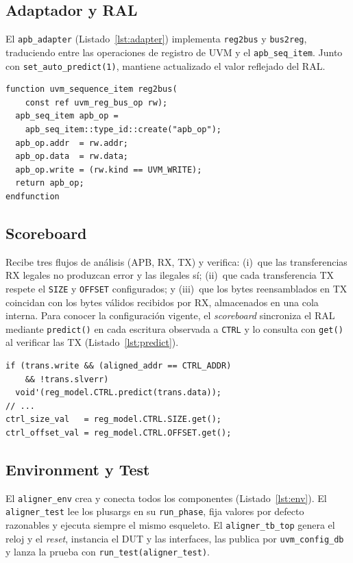 \documentclass[conference]{IEEEtran}
\begin{document}
\subsection{Adaptador y RAL}
El \texttt{apb\_adapter} (Listado~\ref{lst:adapter}) implementa
\texttt{reg2bus} y \texttt{bus2reg}, traduciendo entre las operaciones de
registro de UVM y el \texttt{apb\_seq\_item}. Junto con
\texttt{set\_auto\_predict(1)}, mantiene actualizado el valor reflejado del RAL.

\begin{lstlisting}[caption={Adaptador de registros APB},label={lst:adapter}]
function uvm_sequence_item reg2bus(
    const ref uvm_reg_bus_op rw);
  apb_seq_item apb_op =
    apb_seq_item::type_id::create("apb_op");
  apb_op.addr  = rw.addr;
  apb_op.data  = rw.data;
  apb_op.write = (rw.kind == UVM_WRITE);
  return apb_op;
endfunction
\end{lstlisting}

\subsection{Scoreboard}
Recibe tres flujos de análisis (APB, RX, TX) y verifica: (i)~que las
transferencias RX legales no produzcan error y las ilegales sí; (ii)~que cada
transferencia TX respete el \texttt{SIZE} y \texttt{OFFSET} configurados; y
(iii)~que los bytes reensamblados en TX coincidan con los bytes válidos recibidos
por RX, almacenados en una cola interna. Para conocer la configuración vigente,
el \textit{scoreboard} sincroniza el RAL mediante \texttt{predict()} en cada
escritura observada a \texttt{CTRL} y lo consulta con \texttt{get()} al verificar
las TX (Listado~\ref{lst:predict}).

\begin{lstlisting}[caption={Sincronización del RAL en el scoreboard},label={lst:predict}]
if (trans.write && (aligned_addr == CTRL_ADDR)
    && !trans.slverr)
  void'(reg_model.CTRL.predict(trans.data));
// ...
ctrl_size_val   = reg_model.CTRL.SIZE.get();
ctrl_offset_val = reg_model.CTRL.OFFSET.get();
\end{lstlisting}

\subsection{Environment y Test}
El \texttt{aligner\_env} crea y conecta todos los componentes
(Listado~\ref{lst:env}). El \texttt{aligner\_test} lee los plusargs en su
\texttt{run\_phase}, fija valores por defecto razonables y ejecuta siempre el
mismo esqueleto. El \texttt{aligner\_tb\_top} genera el reloj y el \textit{reset},
instancia el DUT y las interfaces, las publica por \texttt{uvm\_config\_db} y
lanza la prueba con \texttt{run\_test(aligner\_test)}.
\end{document}
